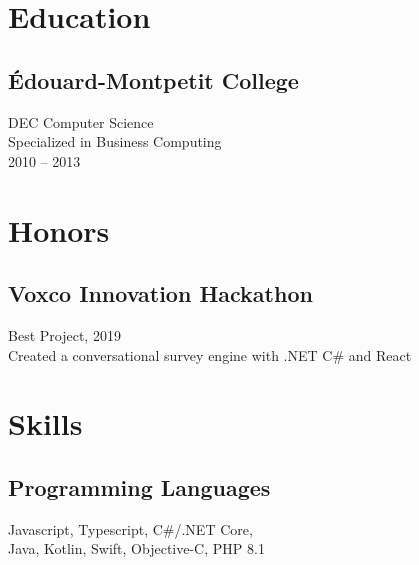 \documentclass{article}
\begin{document}
\setlength{\columnsep}{4em}
\setlength{\columnseprule}{0.4pt}
\begin{paracol}{2}
  \begin{leftcolumn}
    \vspace{-2.5em}
    \section{Education}

    \subsection{Édouard-Montpetit College}
    DEC Computer Science \\
    Specialized in Business Computing \\
    2010 -- 2013

    \section{Honors}

    \subsection{Voxco Innovation Hackathon}
    \faAward\hspace{0.5em}Best Project, 2019 \\
    Created a conversational survey engine with .NET C\# and React \\

    \section{Skills}

    \subsection{Programming Languages}
    Javascript, Typescript, C\#/.NET Core,\\
    Java, Kotlin, Swift, Objective-C, PHP 8.1

    \vspace{0.5em}


\end{leftcolumn}
\end{paracol}
\end{document}
